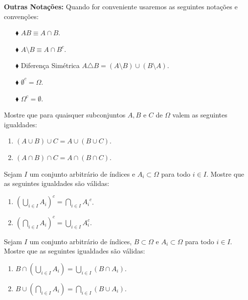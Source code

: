 \noindent
\textbf{Outras Notações:} Quando for conveniente 
usaremos as seguintes notações e convenções:
\begin{enumerate}
\item[$\blacklozenge$] 
$AB\equiv A \cap B$.

\item[$\blacklozenge$] 
$A \setminus B \equiv A \cap B^c$.

\item[$\blacklozenge$] 
Diferença Simétrica 
$A\triangle B = (A \setminus B) \cup (B\setminus A).$

\item[$\blacklozenge$] 
$\emptyset^c = \Omega$.

\item[$\blacklozenge$] 
$\Omega^c = \emptyset$.
\end{enumerate}




\begin{exercicio}[Associatividade] 
Mostre que para quaisquer subconjuntos $A,B$ e $C$ 
de $\Omega$ valem as seguintes igualdades:
\begin{enumerate}
	\item $(A\cup B)\cup C= A \cup ( B \cup C)$.
	\item $(A\cap B)\cap C= A \cap ( B \cap C)$.
\end{enumerate}
\end{exercicio}






\begin{exercicio} 
Sejam $I$ um conjunto arbitrário de índices
e $A_i\subset \Omega$ para todo $i\in I$. Mostre que
as seguintes igualdades são válidas:
\begin{enumerate}
\item 
$
\left( \displaystyle\bigcup_{i \in I}{A_i} \right)^c 
= 
\displaystyle\bigcap_{i \in I}{{A_i}^c}
$.

\item
$
\left( \displaystyle\bigcap_{i \in I}{A_i} \right)^c 
= 
\displaystyle\bigcup_{i \in I}{A_i^c}
$.
%
\end{enumerate}
\end{exercicio}





\begin{exercicio}[Distributiva] 
Sejam $I$ um conjunto arbitrário de índices, 
$B\subset \Omega$ e $A_i\subset \Omega$ para todo $i\in I$. 
Mostre que as seguintes igualdades são válidas:
%
\begin{enumerate}
\item 
$
B \cap \left( \displaystyle\bigcup_{i \in I}{A_i} \right) 
= 
\displaystyle\bigcup_{i \in I}{(B\cap A_i)} 
$.
%
\item
$
B \cup \left( \displaystyle\bigcap_{i \in I}{A_i} \right) 
= 
\displaystyle\bigcap_{i \in I}{(B\cup A_i)} 
$.
\end{enumerate}
%
\end{exercicio}







